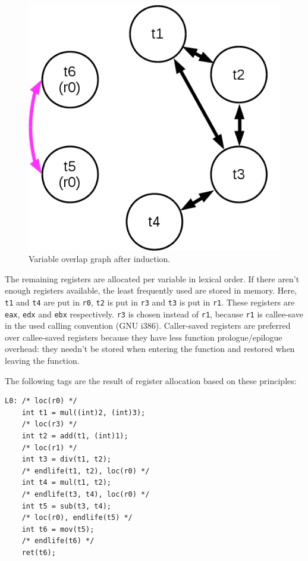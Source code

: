 \documentclass[12pt, a4paper]{article}
\begin{document}
\begin{figure}[h]
\begin{center}
\includegraphics[scale=0.3]{ovldump_ind.png}
\caption{Variable overlap graph after induction.}
\label{fig:ovl_ind}
\end{center}
\end{figure}

The remaining registers are allocated per variable in lexical order. If there
aren't enough registers available, the least frequently used are stored in memory.
Here, \verb+t1+ and \verb+t4+ are put in \verb+r0+, \verb+t2+ is put in \verb+r3+
and \verb+t3+ is put in \verb+r1+. These registers are \verb+eax+, \verb+edx+ and
\verb+ebx+ respectively. \verb+r3+ is chosen instead of \verb+r1+, because
\verb+r1+ is callee-save in the used calling convention (GNU i386). Caller-saved
registers are preferred over callee-saved registers because they have less
function prologue/epilogue overhead: they needn't be stored when entering the
function and restored when leaving the function.

The following tags are the result of register allocation based on these principles:

\begin{lstlisting}
L0:	/* loc(r0) */
	int t1 = mul((int)2, (int)3);
	/* loc(r3) */
	int t2 = add(t1, (int)1);
	/* loc(r1) */
	int t3 = div(t1, t2);
	/* endlife(t1, t2), loc(r0) */
	int t4 = mul(t1, t2);
	/* endlife(t3, t4), loc(r0) */
	int t5 = sub(t3, t4);
	/* loc(r0), endlife(t5) */
	int t6 = mov(t5);
	/* endlife(t6) */
	ret(t6);
\end{lstlisting}
\end{document}
